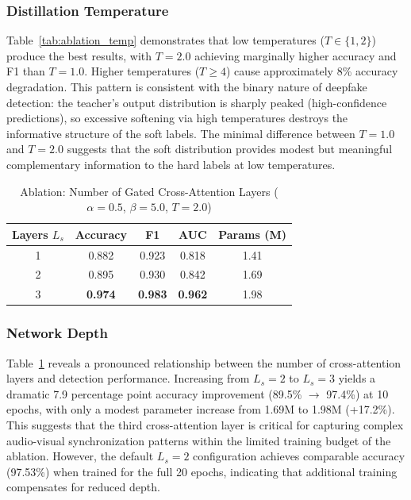 \documentclass[lettersize,journal]{IEEEtran}
\begin{document}
\subsubsection{Distillation Temperature}
Table~\ref{tab:ablation_temp} demonstrates that low temperatures ($T \in \{1, 2\}$) produce the best results, with $T = 2.0$ achieving marginally higher accuracy and F1 than $T = 1.0$. Higher temperatures ($T \geq 4$) cause approximately 8\% accuracy degradation. This pattern is consistent with the binary nature of deepfake detection: the teacher's output distribution is sharply peaked (high-confidence predictions), so excessive softening via high temperatures destroys the informative structure of the soft labels. The minimal difference between $T = 1.0$ and $T = 2.0$ suggests that the soft distribution provides modest but meaningful complementary information to the hard labels at low temperatures.

\begin{table}[!t]
\caption{Ablation: Number of Gated Cross-Attention Layers ($\alpha{=}0.5$, $\beta{=}5.0$, $T{=}2.0$)\label{tab:ablation_layers}}
\centering
\footnotesize
\begin{tabular}{ccccc}
\toprule
\textbf{Layers $L_s$} & \textbf{Accuracy} & \textbf{F1} & \textbf{AUC} & \textbf{Params (M)} \\
\midrule
1 & 0.882 & 0.923 & 0.818 & 1.41 \\
2 & 0.895 & 0.930 & 0.842 & 1.69 \\
3 & \textbf{0.974} & \textbf{0.983} & \textbf{0.962} & 1.98 \\
\bottomrule
\end{tabular}
\end{table}

\subsubsection{Network Depth}
Table~\ref{tab:ablation_layers} reveals a pronounced relationship between the number of cross-attention layers and detection performance. Increasing from $L_s = 2$ to $L_s = 3$ yields a dramatic 7.9 percentage point accuracy improvement (89.5\% $\rightarrow$ 97.4\%) at 10 epochs, with only a modest parameter increase from 1.69M to 1.98M (+17.2\%). This suggests that the third cross-attention layer is critical for capturing complex audio-visual synchronization patterns within the limited training budget of the ablation. However, the default $L_s = 2$ configuration achieves comparable accuracy (97.53\%) when trained for the full 20 epochs, indicating that additional training compensates for reduced depth.
\end{document}
